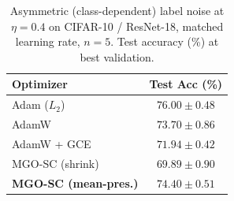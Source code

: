 \begin{table}[!ht]
\centering
\footnotesize
\setlength{\tabcolsep}{6.0pt}
\renewcommand{\arraystretch}{1.15}
\caption{Asymmetric (class-dependent) label noise at $\eta=0.4$ on CIFAR-10 / ResNet-18, matched learning rate, $n=5$. Test accuracy (\%) at best validation.}
\label{tab:asym}
\begin{tabular}{lc}
\toprule
\textbf{Optimizer} & \textbf{Test Acc (\%)} \\
\midrule
Adam ($L_2$)                 & $76.00 \pm 0.48$ \\
AdamW                        & $73.70 \pm 0.86$ \\
AdamW + GCE                  & $71.94 \pm 0.42$ \\
MGO-SC (shrink)              & $69.89 \pm 0.90$ \\
\textbf{MGO-SC (mean-pres.)} & $\mathbf{74.40 \pm 0.51}$ \\
\bottomrule
\end{tabular}
\end{table}
